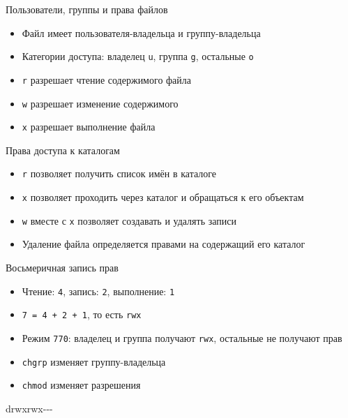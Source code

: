 \documentclass[
  ignorenonframetext,
  aspectratio=169,
  russian,
]{beamer}
\newenvironment{Shaded}{\begin{snugshade}}{\end{snugshade}}
\newcommand{\NormalTok}[1]{\textcolor[rgb]{0.00,0.23,0.31}{#1}}
\providecommand{\tightlist}{%
  \setlength{\itemsep}{0pt}\setlength{\parskip}{0pt}}
\begin{document}
\begin{frame}[fragile]{Пользователи, группы и права файлов}
\protect{}\label{ux43fux43eux43bux44cux437ux43eux432ux430ux442ux435ux43bux438-ux433ux440ux443ux43fux43fux44b-ux438-ux43fux440ux430ux432ux430-ux444ux430ux439ux43bux43eux432}
\begin{itemize}
\tightlist
\item
  Файл имеет пользователя-владельца и группу-владельца
\item
  Категории доступа: владелец \texttt{u}, группа \texttt{g}, остальные
  \texttt{o}
\item
  \texttt{r} разрешает чтение содержимого файла
\item
  \texttt{w} разрешает изменение содержимого
\item
  \texttt{x} разрешает выполнение файла
\end{itemize}
\end{frame}

\begin{frame}[fragile]{Права доступа к каталогам}
\protect{}\label{ux43fux440ux430ux432ux430-ux434ux43eux441ux442ux443ux43fux430-ux43a-ux43aux430ux442ux430ux43bux43eux433ux430ux43c}
\begin{itemize}
\tightlist
\item
  \texttt{r} позволяет получить список имён в каталоге
\item
  \texttt{x} позволяет проходить через каталог и обращаться к его
  объектам
\item
  \texttt{w} вместе с \texttt{x} позволяет создавать и удалять записи
\item
  Удаление файла определяется правами на содержащий его каталог
\end{itemize}
\end{frame}

\begin{frame}[fragile]{Восьмеричная запись прав}
\protect{}\label{ux432ux43eux441ux44cux43cux435ux440ux438ux447ux43dux430ux44f-ux437ux430ux43fux438ux441ux44c-ux43fux440ux430ux432}
\begin{itemize}
\tightlist
\item
  Чтение: \texttt{4}, запись: \texttt{2}, выполнение: \texttt{1}
\item
  \texttt{7\ =\ 4\ +\ 2\ +\ 1}, то есть \texttt{rwx}
\item
  Режим \texttt{770}: владелец и группа получают \texttt{rwx}, остальные
  не получают прав
\item
  \texttt{chgrp} изменяет группу-владельца
\item
  \texttt{chmod} изменяет разрешения
\end{itemize}

\begin{Shaded}
\begin{Highlighting}[]
\NormalTok{drwxrwx{-}{-}{-}}
\end{Highlighting}
\end{Shaded}
\end{frame}
\end{document}
